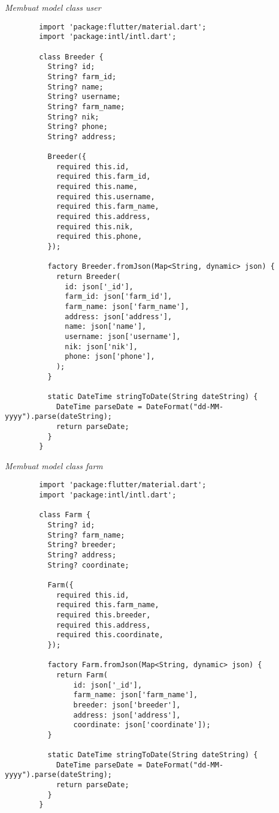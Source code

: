 	\textit{Membuat model class user}
	\begin{lstlisting}
        import 'package:flutter/material.dart';
        import 'package:intl/intl.dart';
        
        class Breeder {
          String? id;
          String? farm_id;
          String? name;
          String? username;
          String? farm_name;
          String? nik;
          String? phone;
          String? address;
        
          Breeder({
            required this.id,
            required this.farm_id,
            required this.name,
            required this.username,
            required this.farm_name,
            required this.address,
            required this.nik,
            required this.phone,
          });
        
          factory Breeder.fromJson(Map<String, dynamic> json) {
            return Breeder(
              id: json['_id'],
              farm_id: json['farm_id'],
              farm_name: json['farm_name'],
              address: json['address'],
              name: json['name'],
              username: json['username'],
              nik: json['nik'],
              phone: json['phone'],
            );
          }
        
          static DateTime stringToDate(String dateString) {
            DateTime parseDate = DateFormat("dd-MM-yyyy").parse(dateString);
            return parseDate;
          }
        }        
	\end{lstlisting}

	\textit{Membuat model class farm}
	\begin{lstlisting}
        import 'package:flutter/material.dart';
        import 'package:intl/intl.dart';
        
        class Farm {
          String? id;
          String? farm_name;
          String? breeder;
          String? address;
          String? coordinate;
        
          Farm({
            required this.id,
            required this.farm_name,
            required this.breeder,
            required this.address,
            required this.coordinate,
          });
        
          factory Farm.fromJson(Map<String, dynamic> json) {
            return Farm(
                id: json['_id'],
                farm_name: json['farm_name'],
                breeder: json['breeder'],
                address: json['address'],
                coordinate: json['coordinate']);
          }
        
          static DateTime stringToDate(String dateString) {
            DateTime parseDate = DateFormat("dd-MM-yyyy").parse(dateString);
            return parseDate;
          }
        }           
	\end{lstlisting}


 



 